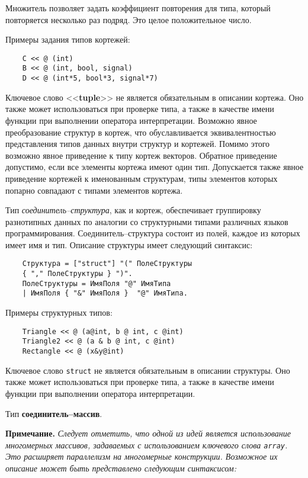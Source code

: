 {Множитель позволяет задать коэффициент повторения для типа, который повторяется несколько раз подряд. Это целое положительное число.

Примеры задания типов кортежей:

\begin{verbatim}
    С << @ (int)
    В << @ (int, bool, signal)
    D << @ (int*5, bool*3, signal*7)
\end{verbatim}

Ключевое слово <<\textbf{tuple}>> не является обязательным в описании кортежа. Оно также может использоваться при проверке типа, а также в качестве имени функции при выполнении оператора интерпретации. Возможно явное преобразование структур в кортеж, что обуславливается эквивалентностью представления типов данных внутри структур и кортежей. Помимо этого возможно явное приведение к типу кортеж векторов. Обратное приведение допустимо, если все элементы кортежа имеют один тип. Допускается также явное приведение кортежей к именованным структурам, типы элементов которых попарно совпадают с типами элементов кортежа.

Тип \textit{соединитель--структура}, как и кортеж, обеспечивает группировку разнотипных данных по аналогии со структурными типами различных языков программирования. Соединитель--структура состоит из полей, каждое из которых имеет имя и тип. Описание структуры имеет следующий синтаксис:

\begin{verbatim}
    Структура = ["struct"] "(" ПолеСтруктуры
    { "," ПолеСтруктуры } ")".
    ПолеСтруктуры = ИмяПоля "@" ИмяТипа
    | ИмяПоля { "&" ИмяПоля }  "@" ИмяТипа.
\end{verbatim}

Примеры структурных типов:

\begin{verbatim}
    Triangle << @ (a@int, b @ int, c @int)
    Triangle2 << @ (a & b @ int, c @int)
    Rectangle << @ (x&y@int)
\end{verbatim}

Ключевое слово \verb|struct| не является обязательным в описании структуры. Оно также может использоваться при проверке типа, а также в качестве имени функции при выполнении оператора интерпретации.

Тип \textbf{соединитель--массив}.

\textbf{Примечание.}
\textit{Следует отметить, что одной из идей является использование многомерных массивов, задаваемых с использованием ключевого слова \texttt{array}. Это расширяет параллелизм на многомерные конструкции. Возможное их описание может быть представлено следующим синтаксисом:}

}
